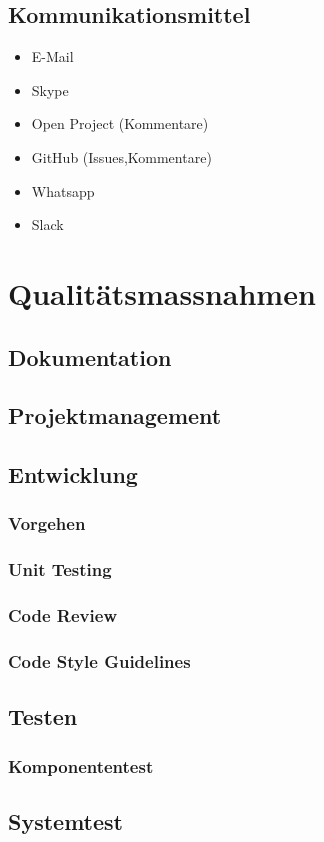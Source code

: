 \documentclass[11pt]{scrartcl}
\begin{document}
\subsection{Kommunikationsmittel}
\begin{itemize}
    \item E-Mail
    \item Skype
    \item Open Project (Kommentare)
    \item GitHub (Issues,Kommentare)
    \item Whatsapp
    \item Slack
\end{itemize}

\section{Qualitätsmassnahmen}

\subsection{Dokumentation}

\subsection{Projektmanagement}

\subsection{Entwicklung}

\subsubsection{Vorgehen}

\subsubsection{Unit Testing}

\subsubsection{Code Review}

\subsubsection{Code Style Guidelines}

\subsection{Testen}

\subsubsection{Komponententest}

\subsection{Systemtest}
\end{document}
